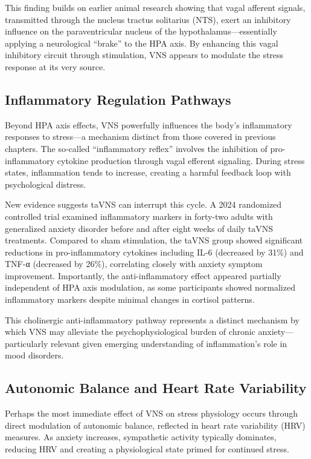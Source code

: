 \documentclass[
  Letterpaper,
]{scrbook}
\begin{document}
This finding builds on earlier animal research showing that vagal
afferent signals, transmitted through the nucleus tractus solitarius
(NTS), exert an inhibitory influence on the paraventricular nucleus of
the hypothalamus---essentially applying a neurological ``brake'' to the
HPA axis. By enhancing this vagal inhibitory circuit through
stimulation, VNS appears to modulate the stress response at its very
source.

\subsection{Inflammatory Regulation
Pathways}\label{inflammatory-regulation-pathways}

Beyond HPA axis effects, VNS powerfully influences the body's
inflammatory responses to stress---a mechanism distinct from those
covered in previous chapters. The so-called ``inflammatory reflex''
involves the inhibition of pro-inflammatory cytokine production through
vagal efferent signaling. During stress states, inflammation tends to
increase, creating a harmful feedback loop with psychological distress.

New evidence suggests taVNS can interrupt this cycle. A 2024 randomized
controlled trial examined inflammatory markers in forty-two adults with
generalized anxiety disorder before and after eight weeks of daily taVNS
treatments. Compared to sham stimulation, the taVNS group showed
significant reductions in pro-inflammatory cytokines including IL-6
(decreased by 31\%) and TNF-α (decreased by 26\%), correlating closely
with anxiety symptom improvement. Importantly, the anti-inflammatory
effect appeared partially independent of HPA axis modulation, as some
participants showed normalized inflammatory markers despite minimal
changes in cortisol patterns.

This cholinergic anti-inflammatory pathway represents a distinct
mechanism by which VNS may alleviate the psychophysiological burden of
chronic anxiety---particularly relevant given emerging understanding of
inflammation's role in mood disorders.

\subsection{Autonomic Balance and Heart Rate
Variability}\label{autonomic-balance-and-heart-rate-variability}

Perhaps the most immediate effect of VNS on stress physiology occurs
through direct modulation of autonomic balance, reflected in heart rate
variability (HRV) measures. As anxiety increases, sympathetic activity
typically dominates, reducing HRV and creating a physiological state
primed for continued stress.
\end{document}
